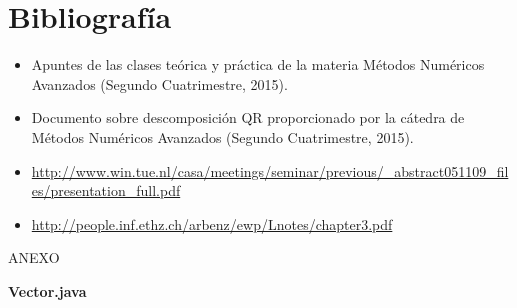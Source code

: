 \documentclass[a4paper,10pt,spanish]{article}
\begin{document}
\pagebreak

\section{Bibliografía}
\begin{itemize}

\item Apuntes de las clases teórica y práctica de la materia Métodos Numéricos Avanzados (Segundo Cuatrimestre, 2015).

\item Documento sobre descomposición QR proporcionado por la cátedra de Métodos Numéricos Avanzados (Segundo Cuatrimestre, 2015).

\item \url{http://www.win.tue.nl/casa/meetings/seminar/previous/_abstract051109_files/presentation_full.pdf}

\item \url{http://people.inf.ethz.ch/arbenz/ewp/Lnotes/chapter3.pdf}

\end{itemize}

\pagebreak

\begin{large}
ANEXO
\end{large}

\begin{center}
\textbf{Vector.java}
\end{center}
\end{document}
